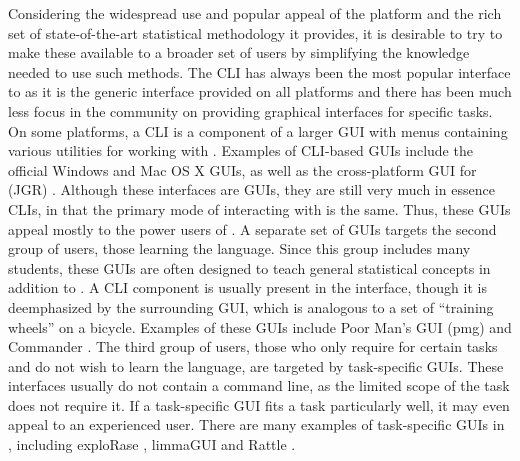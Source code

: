 \documentclass[article,shortnames]{jss}
\begin{document}
Considering the widespread use and popular appeal of the 
platform and the rich set of state-of-the-art statistical methodology
it provides, it is desirable to try to make these available to a
broader set of users by simplifying the knowledge needed to use such
methods.
The CLI has always been the most popular interface to  as
it is the generic interface provided on all platforms and there has
been much less focus in the  community on providing
graphical
interfaces for specific tasks.  On some platforms, a CLI is a
component of a larger GUI with menus containing various utilities for
working with . Examples of CLI-based  GUIs
include the official Windows and Mac OS X GUIs, as well as the
cross-platform  GUI for  (JGR) \citep{JGR}.
Although these
interfaces are GUIs, they are still very much in essence CLIs, in that
the primary mode of interacting with  is the same. Thus,
these GUIs appeal mostly to the power users of .  A
separate set of GUIs targets the second group of users, those learning
the  language. Since this group includes many students,
these GUIs are often designed to teach general statistical concepts in
addition to .  A CLI component is usually present in the
interface, though it is deemphasized by the surrounding GUI, which is
analogous to a set of ``training wheels'' on a bicycle. Examples of
these GUIs include Poor Man's GUI (pmg) \citep{pmg} and 
Commander
\citep{rcmndr}. The third group of users, those who only require
 for certain tasks and do not wish to learn the language,
are targeted by task-specific GUIs. These interfaces usually do not
contain a command line, as the limited scope of the task does not
require it. If a task-specific GUI fits a task particularly well, it
may even appeal to an experienced user. There are many examples of
task-specific GUIs in , including exploRase
\citep{explorase}, limmaGUI \citep{limma} and Rattle \citep{rattle}.
\end{document}
